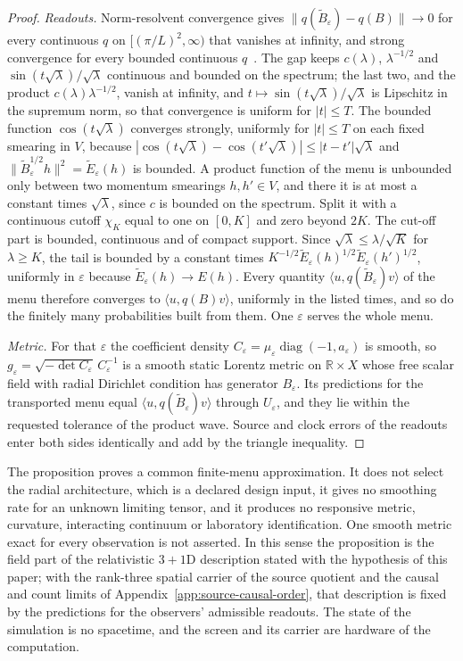 \documentclass[11pt]{article}
\begin{document}
\begin{proof}
\emph{Readouts.} Norm-resolvent convergence gives
$\|q(\widetilde B_\varepsilon)-q(B)\|\to0$ for every continuous $q$ on
$[(\pi/L)^2,\infty)$ that vanishes at infinity, and strong convergence for
every bounded continuous $q$~\cite{reedsimon1980}. The gap keeps
$c(\lambda)$, $\lambda^{-1/2}$ and $\sin(t\sqrt\lambda)/\sqrt\lambda$
continuous and bounded on the spectrum; the last two, and the product
$c(\lambda)\lambda^{-1/2}$, vanish at infinity, and $t\mapsto\sin(t\sqrt\lambda)/\sqrt\lambda$ is Lipschitz in the
supremum norm, so that convergence is uniform for $|t|\leq T$. The bounded
function $\cos(t\sqrt\lambda)$ converges strongly, uniformly for $|t|\leq T$
on each fixed smearing in $V$, because
$|\cos(t\sqrt\lambda)-\cos(t'\sqrt\lambda)|\leq|t-t'|\sqrt\lambda$ and
$\|\widetilde B_\varepsilon^{1/2}h\|^2=\widetilde E_\varepsilon(h)$ is
bounded. A product function of the menu is unbounded only between two
momentum smearings $h,h'\in V$, and there it is at most a constant times
$\sqrt\lambda$, since $c$ is bounded on the spectrum. Split it with a
continuous cutoff $\chi_K$ equal to one on $[0,K]$ and zero beyond $2K$. The
cut-off part is bounded, continuous and of compact support. Since
$\sqrt\lambda\leq\lambda/\sqrt K$ for $\lambda\geq K$, the tail is bounded
by a constant times
$K^{-1/2}\widetilde E_\varepsilon(h)^{1/2}\widetilde E_\varepsilon(h')^{1/2}$,
uniformly in $\varepsilon$ because $\widetilde E_\varepsilon(h)\to E(h)$. Every quantity $\langle u,q(\widetilde
B_\varepsilon)v\rangle$ of the menu therefore converges to
$\langle u,q(B)v\rangle$, uniformly in the listed times, and so do the
finitely many probabilities built from them. One $\varepsilon$ serves the
whole menu.

\emph{Metric.} For that $\varepsilon$ the coefficient density
$C_\varepsilon=\mu_\varepsilon\operatorname{diag}(-1,a_\varepsilon)$ is
smooth, so $g_\varepsilon=\sqrt{-\det C_\varepsilon}\,C_\varepsilon^{-1}$ is
a smooth static Lorentz metric on $\mathbb R\times X$ whose free scalar field
with radial Dirichlet condition has generator $B_\varepsilon$. Its
predictions for the transported menu equal
$\langle u,q(\widetilde B_\varepsilon)v\rangle$ through $U_\varepsilon$, and
they lie within the requested tolerance of the product wave. Source and clock
errors of the readouts enter both sides identically and add by the triangle
inequality.
\end{proof}

The proposition proves a common finite-menu approximation. It does not
select the radial architecture, which is a declared design input, it gives no
smoothing rate for an unknown limiting tensor, and it produces no responsive
metric, curvature, interacting continuum or laboratory identification. One
smooth metric exact for every observation is not asserted. In this sense the
proposition is the field part of the relativistic $3{+}1$D description stated
with the hypothesis of this paper; with the rank-three spatial carrier of the
source quotient and the causal and count limits of
Appendix~\ref{app:source-causal-order}, that description is fixed by the
predictions for the observers' admissible readouts. The state of the
simulation is no spacetime, and the screen and its carrier are hardware of
the computation.
\end{document}
